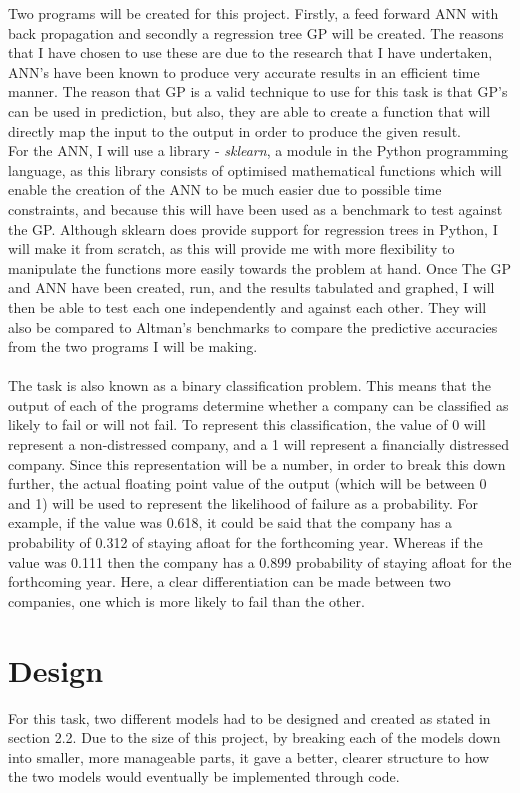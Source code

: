 \documentclass[11pt]{article}
\begin{document}
Two programs will be created for this project. Firstly, a feed forward ANN with back propagation and secondly a regression tree GP will be created. The reasons that I have chosen to use these are due to the research that I have undertaken, ANN's have been known to produce very accurate results in an efficient time manner. The reason that GP is a valid technique to use for this task is that GP's can be used in prediction, but also, they are able to create a function that will directly map the input to the output in order to produce the given result. \\
For the ANN, I will use a library - \textit{sklearn}, a module in the Python programming language,  as this library consists of optimised mathematical functions which will enable the creation of the ANN to be much easier due to possible time constraints, and because this will have been used as a benchmark to test against the GP. Although sklearn does provide support for regression trees in Python, I will make it from scratch, as this will provide me with more flexibility to manipulate the functions more easily towards the problem at hand. 
Once The GP and ANN have been created, run, and the results tabulated and graphed, I will then be able to test each one independently and against each other. They will also be compared to Altman's benchmarks to compare the predictive accuracies from the two programs I will be making. \\\\
The task is also known as a binary classification problem. This means that the output of each of the programs determine whether a company can be classified as likely to fail or will not fail. To represent this classification, the value of 0 will represent a non-distressed company, and a 1 will represent a financially distressed company.
Since this representation will be a number, in order to break this down further, the actual floating point value of the output (which will be between 0 and 1) will be used  to represent the likelihood of failure as a probability. For example, if the value was 0.618, it could be said that the company has a probability of 0.312 of staying afloat for the forthcoming year. Whereas if the value was 0.111 then the company has a 0.899 probability of staying afloat for the forthcoming year. Here, a clear differentiation can be made between two companies, one which is more likely to fail than the other.


\newpage
\section{Design}
For this task, two different models had to be designed and created as stated in section 2.2. Due to the size of this project, by breaking each of the models down into smaller, more manageable parts, it gave a better, clearer structure to how the two models would eventually be implemented through code. 
\end{document}
